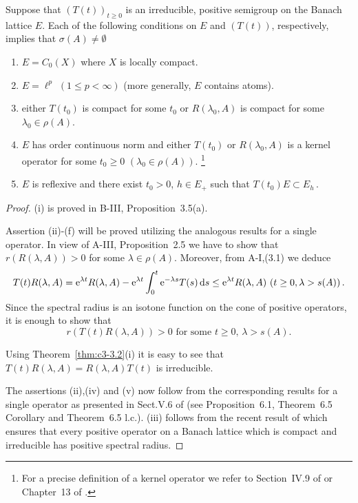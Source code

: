 \begin{theorem}\label{thm:c3-3.7}

Suppose that $(T(t))_{t\geq 0}$ is an irreducible, positive semigroup on the Banach lattice $E$.
Each of the following conditions on $E$ and $(T(t))$, respectively, implies that $\sigma(A) \neq \emptyset$
\begin{enumerate}[\upshape (i)]
	\item
	$E = C_{0}(X)$ where $X$ is locally compact.

	\item 
	$E = \ell^{p}$ $(1 \leq p < \infty)$ (more generally, $E$ contains atoms).

	\item either $T(t_{0})$ is compact for some $t_{0}$ or $R(\lambda_{0},A)$ is compact for some $\lambda_{0} \in \rho(A)$.

	\item 
	$E$ has order continuous norm and either $T(t_{0})$ or $R(\lambda_{0},A)$ is a kernel operator for some $t_{0} \geq 0$ $(\lambda_{0} \in \rho(A))$. 	
	\footnote[1]{For a precise definition of a kernel operator we refer to Section~IV.9 of \citet{schaefer:1974} or Chapter~13 of \citet{zaanen:1983}.}

	\item 
	$E$ is reflexive and there exist $t_{0} > 0$, $h \in E_{+}$ such that $T(t_{0})E \subset E_{h}$\,.
\end{enumerate}
\end{theorem}
\begin{proof}
	(i) is proved in B-III, Proposition~3.5(a).
	
	Assertion (ii)-(f) will be proved utilizing the analogous results for a single operator.
	In view of A-III, Proposition~2.5 we have to show that $r(R(\lambda,A)) > 0$ for some $\lambda \in \rho(A)$.
	Moreover, from A-I,(3.1) we deduce
	\begin{align*}
		T(t)R(\lambda,A) = \mathrm{e}^{\lambda t}R(\lambda,A) - \mathrm{e}^{\lambda t}\int_{0}^{t} \mathrm{e}^{-\lambda s}T(s)\mathop{}\!\mathrm{d}{s} \leq \mathrm{e}^{\lambda t}R(\lambda,A) \ (t\geq 0, \lambda>s(A))\,.
	\end{align*}
	Since the spectral radius is an isotone function on the cone of positive operators, it is enough to show that
	\begin{equation}\label{eq:c3-3.12}
		r(T(t)R(\lambda,A)) > 0 \text{ for some } t \geq 0,\, \lambda > s(A).
	\end{equation}
	
	Using Theorem~\ref{thm:c3-3.2}(i) it is easy to see that $T(t)R(\lambda,A) = R(\lambda,A)T(t)$ is irreducible.
	
	The assertions (ii),(iv) and (v) now follow from the corresponding results for a single operator as presented in Sect.V.6 of \citet{schaefer:1974} (see Proposition~6.1, Theorem~6.5 Corollary and Theorem~6.5 l.c.).
	(iii) follows from the recent result of \citet{depagter:1986} which ensures that every positive operator on a Banach lattice which is compact and irreducible has positive spectral radius.
\end{proof}
